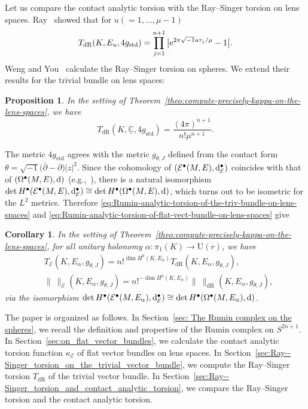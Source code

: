 \documentclass[pdftex]{sigma}
\numberwithin{equation}{section}
\newtheorem{Corollary}[Theorem]{Corollary}
\newtheorem{Proposition}[Theorem]{Proposition}
 { \theoremstyle{definition}
\newtheorem{Definition}[Theorem]{Definition}
\newtheorem{Note}[Theorem]{Note}
\newtheorem{Example}[Theorem]{Example}
\newtheorem{Remark}[Theorem]{Remark} }
\newcommand{\ii}{\sqrt{-1}}
\newcommand{\deRham}{\mathrm{dR}}
\newcommand{\RN}{\cE}
\newcommand{\bC}{\mathbb{C}}
\newcommand{\cE}{\mathcal{E}}
\begin{document}
Let us compare the contact analytic torsion with the Ray--Singer torsion on lens spaces.
Ray~\cite{Ray-70} showed that for $u (= 1 ,\ldots , \mu -1)$
\[
 T_{\deRham} ( K , E_{u}, 4 g_{\mathrm{std}} )
 =
 \prod_{j=1}^{n+1} \big| {\rm e}^{ 2 \pi \ii u {\tau}_j / \mu } -1 \big|
 .
\]
Weng and You~\cite{Weng-You-96} calculate the Ray--Singer torsion on spheres.
We extend their results for the trivial bundle on lens spaces:
\begin{Proposition}
 \label{prop:Ray--Singer_torsion_of_the_trivial_bundle_on_lens_spaces}
 In the setting of Theorem~{\rm \ref{theo:compute-precisely-kappa-on-the-lens-spaces}},
 we have
 \[
 T_{\deRham} ( K, \underline{\bC} , 4 g_{\mathrm{std}})
 = \frac{ (4 \pi)^{n+1}}{ n! \mu^{n+1}} .
 \]
\end{Proposition}


The metric $4 g_{\mathrm{std}}$ agrees with the metric $g_{\theta , J}$ defined from the contact form $\theta = \sqrt{-1} \big(\bar{\partial} - \partial\big) |z|^2$.
Since the cohomology of $(\cE ^\bullet (M,E) , {\rm d}_\RN ^\bullet)$
coincides with that of $ (\Omega^\bullet (M,E) , {\rm d} )$ (e.g.,~\cite[p.~286]{Rumin-94}), there is a natural isomorphism
$\det H^\bullet (\cE ^\bullet (M,E) , {\rm d}_\RN ^\bullet)
\cong
\det H^\bullet (\Omega^\bullet (M,E) , {\rm d} )
$, which turns out to be isometric for the $L^2$ metrics.
Therefore \eqref{eq:Rumin-analytic-torsion-of-the-triv-bundle-on-lens-spaces} and
\eqref{eq:Rumin-analytic-torsion-of-flat-vect-bundle-on-lens-spaces} give
\begin{Corollary}
\label{cor:Rumin-and-Ray--Singer-analytic-torsion-on-lens-spaces}
In the setting of Theorem~{\rm \ref{theo:compute-precisely-kappa-on-the-lens-spaces}},
for all unitary holonomy $\alpha \colon \pi_{1}(K) \to \mathrm{U} (r)$,
we have
\begin{align*}
& T_{\RN} ( K, E_{\alpha} , g_{\theta , J})
 =
 n!^{\dim H^0 ( K , E_{\alpha}) }
 T_{\deRham} ( K, E_{\alpha} , g_{\theta , J})
 ,
 \\
& \| \ \|_\RN ( K, E_{\alpha} , g_{\theta , J})
=
 n!^{- \dim H^0 ( K , E_{\alpha}) }
 \| \ \|_{\deRham} ( K, E_{\alpha} , g_{\theta , J})
 ,
\end{align*}
via the isomorphism $\det H^\bullet (\cE ^\bullet (M,E_{\alpha} ) , {\rm d}_\RN ^\bullet)
\cong\det H^\bullet (\Omega^\bullet (M,E_{\alpha}) , {\rm d} )$.
\end{Corollary}

The paper is organized as follows.
In Section~\ref{sec: The Rumin complex on the spheres},
we recall the definition and properties of the Rumin complex on $S^{2n+1}$.
In Section~\ref{sec:on_flat_vector_bundles},
we calculate the contact analytic torsion function $\kappa_\RN $ of flat vector bundles on lens spaces.
In Section~\ref{sec:Ray--Singer_torsion_on_the_trivial_vector_bundle},
we compute the Ray--Singer torsion $T_{\deRham} $ of the trivial vector bundle.
In Section~\ref{sec:Ray--Singer_torsion_and_contact_analytic_torsion},
we compare the Ray--Singer torsion and the contact analytic torsion.
\end{document}
